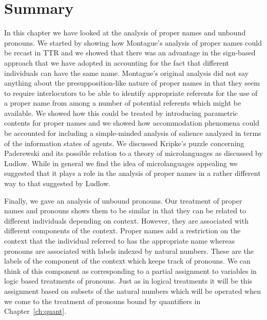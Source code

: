 
    


  



\section{Summary}

In this chapter we have looked at the analysis of proper names and
unbound pronouns.  We
started by showing how Montague's analysis of proper names could be
recast in TTR and we showed that there was an advantage in the
sign-based approach that we have adopted in accounting for the fact
that different individuals can have the same name.  Montague's
original analysis did not say anything about the presupposition-like
nature of proper names in that they seem to require interlocutors to
be able to identify appropriate referents for the use of a proper name
from among a number of potential referents which might be available.
We showed how this could be treated by introducing parametric
contents for proper names and we showed how accommodation phenomena
could be accounted for including a simple-minded analysis of salience
analyzed in terms of the information states of agents.   We
discussed Kripke's puzzle concerning Paderewski and its possible
relation to a theory of microlanguages as discussed by
Ludlow.  While in general we find the idea of microlanguages appealing
we suggested that it plays a role in the analysis of proper names in a
rather different way to that suggested by Ludlow.

Finally, we gave an analysis of unbound pronouns.  Our treatment of
proper names and pronouns shows them to be similar in that they can be
related to different individuals depending on context.  However, they
are associated with different components of the context.  Proper names
add a restriction on the context that the individual referred to has
the appropriate name whereas pronouns are associated with labels
indexed by natural numbers.  These are the labels of the component of
the context which keeps track of pronouns.  We can think of this
component as corresponding to a partial assignment to variables in
logic based treatments of pronouns.  Just as in logical treatments
it will be this assignment based on subsets of the natural numbers
which will be operated when we come to the treatment of pronouns bound
by quantifiers in Chapter~\ref{ch:quant}.
  
  


